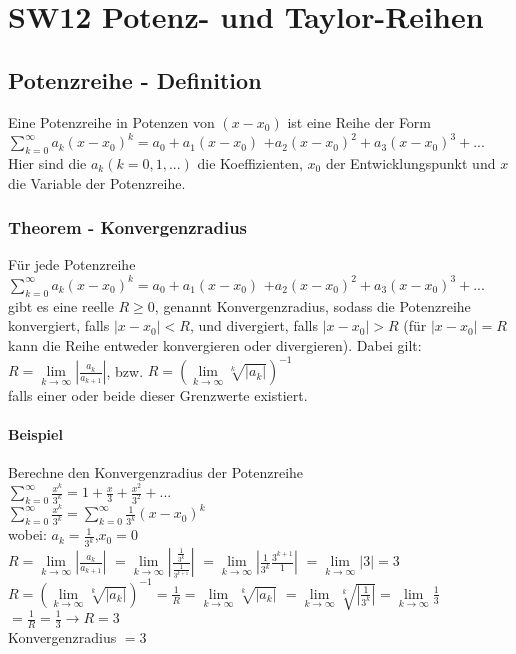 \documentclass[../main.tex]{subfiles}
\begin{document}
\chapter{SW12 Potenz- und Taylor-Reihen}
\section{Potenzreihe - Definition}
Eine Potenzreihe in Potenzen von $(x-x_0)$ ist eine Reihe der Form \\
$\sum\limits_{k=0}^\infty a_k(x-x_0)^k = a_0+a_1(x-x_0)$
$+a_2(x-x_0)^2+a_3(x-x_0)^3+...$ \\ [7pt]
Hier sind die $a_k(k=0,1,...)$ die Koeffizienten, $x_0$ der Entwicklungspunkt und 
$x$ die Variable der Potenzreihe.

\subsection{Theorem - Konvergenzradius}
Für jede Potenzreihe \\ [7pt]
$\sum\limits_{k=0}^\infty a_k(x-x_0)^k = a_0+a_1(x-x_0)$
$+a_2(x-x_0)^2+a_3(x-x_0)^3+...$ \\ [7pt]
gibt es eine reelle $R\geq 0$, genannt Konvergenzradius, sodass die Potenzreihe konvergiert,
falls $|x-x_0|<R$, und divergiert, falls $|x-x_0|>R$ (für $|x-x_0|=R$ kann die Reihe entweder
konvergieren oder divergieren). Dabei gilt: \\ [7pt]
$R=\lim\limits_{k\to\infty}|\frac{a_k}{a_{k+1}}|$, bzw. $R=(\lim\limits_{k\to\infty}\sqrt[k]{|a_k|})^{-1}$ \\ [7pt]
falls einer oder beide dieser Grenzwerte existiert.

\subsubsection{Beispiel}
Berechne den Konvergenzradius der Potenzreihe \\
$\sum\limits_{k=0}^\infty \frac{x^k}{3^k} = 1+\frac{x}{3}+\frac{x^2}{3^2}+... $ \\ [7pt]
$\sum\limits_{k=0}^\infty \frac{x^k}{3^k} = \sum\limits_{k=0}^\infty \frac{1}{3^k}(x-x_0)^k$ \\ [7pt]
wobei: $a_k = \frac{1}{3^k}$,$x_0=0$ \\ [7pt]
$R=\lim\limits_{k\to\infty}|\frac{a_k}{a_{k+1}}|$
$=\lim\limits_{k\to\infty}|\frac{\frac{1}{3^k}}{\frac{1}{3^{k+1}}}|$
$=\lim\limits_{k\to\infty}|\frac{1}{3^k}\frac{3^{k+1}}{1}|$
$=\lim\limits_{k\to\infty}|3|=3$ \\ [7pt]
$R=(\lim\limits_{k\to\infty}\sqrt[k]{|a_k|})^{-1} = \frac{1}{R} = \lim\limits_{k\to\infty}\sqrt[k]{|a_k|}$
$ = \lim\limits_{k\to\infty}\sqrt[k]{|\frac{1}{3^k}|} = \lim\limits_{k\to\infty} \frac{1}{3}$ \\
$ = \frac{1}{R} = \frac{1}{3} \longrightarrow R = 3$ \\ [7pt]
Konvergenzradius $=3$
\end{document}

